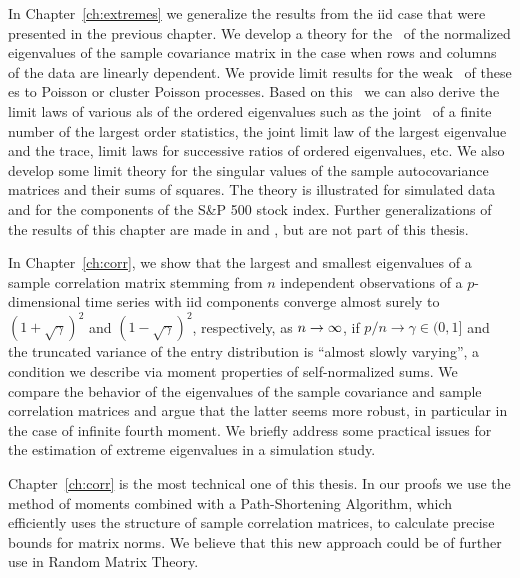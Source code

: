 In Chapter~\ref{ch:extremes} we generalize the results from the iid case that were presented in the previous chapter. 
We develop a theory for the \pp\ of the normalized eigenvalues
of the sample covariance matrix in the case when rows and columns of the data are linearly dependent.
We provide limit results for the weak \con\ of these \pp es to Poisson or cluster Poisson processes. Based on
this \con\ we can also derive the limit laws of various \fct als of the ordered eigenvalues such as the
joint \con\ of a finite number of the largest order statistics, the joint limit law of the largest eigenvalue and the trace,
limit laws for successive ratios of ordered eigenvalues,
etc. We also develop some
limit theory for the singular values of the sample autocovariance matrices and their sums of squares. The theory is illustrated
for simulated data and for the components of the S\&P 500 stock index. Further generalizations of the results of this chapter are made in \cite{heiny:mikosch:2016:noniid1} and \cite{heiny:mikosch:2016:stochvol1}, but are not part of this thesis.

In Chapter~\ref{ch:corr}, we show that the largest and smallest eigenvalues 
of a sample correlation matrix stemming from $n$ independent observations of a $p$-dimensional 
time series with iid components converge almost surely to $(1+\sqrt{\gamma})^2$ and $(1-\sqrt{\gamma})^2$, 
respectively, as $n \to \infty$, if $p/n\to \gamma \in (0,1]$ and the truncated variance of the entry 
distribution is ``almost slowly varying'', a condition we describe via moment 
properties of self-normalized sums. We compare the behavior of the eigenvalues of the 
sample covariance and sample correlation matrices and argue that the latter seems more robust, 
in particular in the case of infinite fourth moment. We briefly address some practical issues 
for the estimation of extreme eigenvalues in a simulation study.  

Chapter~\ref{ch:corr} is the most technical one of this thesis. %
In our proofs we use the method of moments combined with a Path-Shortening Algorithm, 
which efficiently uses the structure of sample correlation matrices, 
to calculate precise bounds for matrix norms. We believe that this new approach could be of further use in Random Matrix Theory. 
\bigskip


